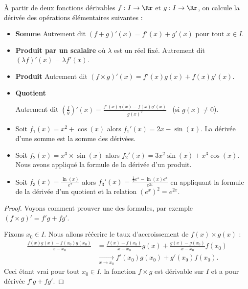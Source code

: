 \documentclass[11pt,class=report,crop=false]{standalone}
\begin{document}
\begin{proposition}
À partir de deux fonctions dérivables $f : I \to \Rr$ et $g : I \to \Rr$, on calcule la dérivée des opérations élémentaires suivantes :
\begin{itemize}
  \item \textbf{Somme} 
  Autrement dit $(f+g)'(x) = f'(x)+g'(x)$ pour tout $x \in I$.
  
  \item \textbf{Produit par un scalaire} 
  où $\lambda$ est un réel fixé. Autrement dit $(\lambda f)'(x) = \lambda f'(x)$. 
  
  \item \textbf{Produit}
  Autrement dit  $(f \times g)'(x) = f'(x)g(x)+f(x)g'(x)$.
  
  \item \textbf{Quotient}
  
  Autrement dit $\displaystyle\left(\frac{f}{g}\right)'(x)=\frac{f'(x)g(x)-f(x)g'(x)}{g(x)^2}$ \  (si $g(x) \neq 0$).
  
\end{itemize}
\end{proposition}

\begin{exemple}
\sauteligne
\begin{itemize}
  \item Soit $f_1(x) = x^2 + \cos(x)$ alors $f_1'(x) = 2x - \sin(x)$. La dérivée d'une somme est la somme des dérivées.
  
  \item Soit $f_2(x) = x^3 \times \sin(x)$ alors $f_2'(x) = 3x^2 \sin(x) + x^3 \cos(x)$. Nous avons appliqué la formule de la dérivée d'un produit.
  
  \item Soit $f_3(x) = \frac{\ln(x)}{e^x}$ alors $f_3'(x) = \frac{\frac1xe^x - \ln(x)e^x}{e^{2x}}$ en appliquant la formule de la dérivée d'un quotient et la relation $(e^x)^2 = e^{2x}$. 
\end{itemize}
\end{exemple}

\begin{proof}
Voyons comment prouver une des formules, par exemple $(f \times g)' = f'g+fg'$.

Fixons $x_0 \in I$. Nous allons réécrire le taux d'accroissement de $f(x)\times g(x)$ :
\begin{align*}
\frac{f(x)g(x)-f(x_0)g(x_0)}{x-x_0}
&=\frac{f(x)-f(x_0)}{x-x_0} g(x)+\frac{g(x)-g(x_0)}{x-x_0}f(x_0)\\
&\xrightarrow[x\to x_0]{} f'(x_0)g(x_0)+g'(x_0)f(x_0).
\end{align*}
Ceci étant vrai pour tout $x_0 \in I$, la fonction $f\times g$ est dérivable sur $I$ et a pour dérivée $f'g+fg'$.
\end{proof}
\end{document}
